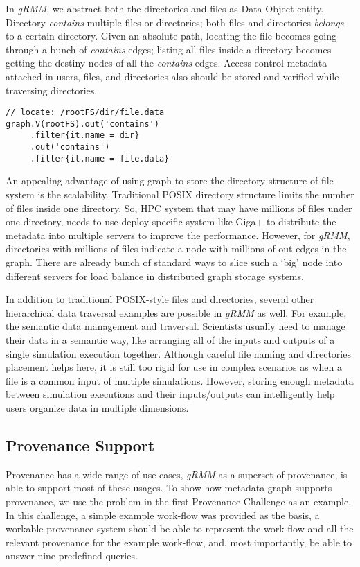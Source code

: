 In \textit{gRMM}, we abstract both the directories and files as Data Object entity. Directory \textit{contains} multiple files or directories; both files and directories \textit{belongs} to a certain directory. Given an absolute path, locating the file becomes going through a bunch of \textit{contains} edges; listing all files inside a directory becomes getting the destiny nodes of all the \textit{contains} edges. Access control metadata attached in users, files, and directories also should be stored and verified while traversing directories. 

\begin{lstlisting}
// locate: /rootFS/dir/file.data
graph.V(rootFS).out('contains')
     .filter{it.name = dir}
     .out('contains')
     .filter{it.name = file.data}
\end{lstlisting}

An appealing advantage of using graph to store the directory structure of file system is the scalability. Traditional POSIX directory structure limits the number of files inside one directory. So, HPC system that may have millions of files under one directory, needs to use deploy specific system like Giga+ to distribute the metadata into multiple servers to improve the performance. However, for \textit{gRMM}, directories with millions of files indicate a node with millions of out-edges in the graph. There are already bunch of standard ways to slice such a `big' node into different servers for load balance in distributed graph storage systems.

In addition to traditional POSIX-style files and directories, several other hierarchical data traversal examples are possible in \textit{gRMM} as well. For example, the semantic data management and traversal. Scientists usually need to manage their data in a semantic way, like arranging all of the inputs and outputs of a single simulation execution together. Although careful file naming and directories placement helps here, it is still too rigid for use in complex scenarios as when a file is a common input of multiple simulations. However, storing enough metadata between simulation executions and their inputs/outputs can intelligently help users organize data in multiple dimensions.

\subsection{Provenance Support}
Provenance has a wide range of use cases, \textit{gRMM} as a superset of provenance, is able to support most of these usages. To show how metadata graph supports provenance, we use the problem in the first Provenance Challenge as an example. In this challenge, a simple example work-flow was provided as the basis, a workable provenance system should be able to represent the work-flow and all the relevant provenance for the example work-flow, and, most importantly, be able to answer nine predefined queries.

